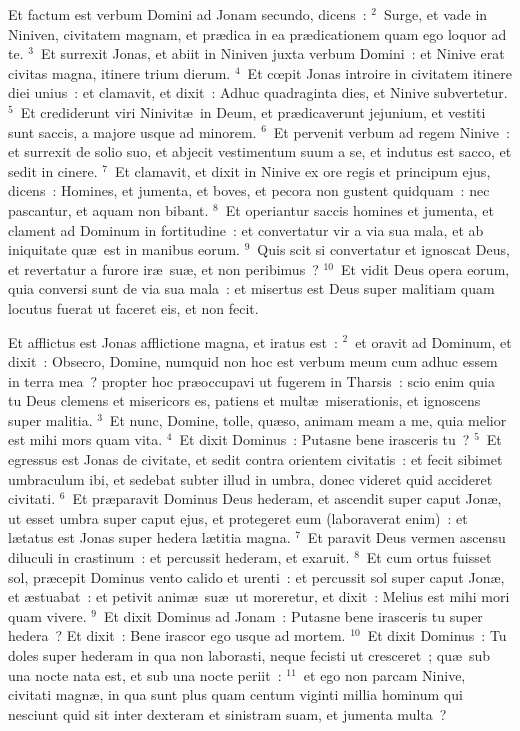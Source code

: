 \lettrine[lines=3,image=true,loversize=0.05,lraise=-0.03]{E}{}t factum est verbum Domini ad Jonam secundo, dicens~:
${}^{2}$~Surge, et vade in Niniven, civitatem magnam, et pr\ae dica in ea pr\ae dicationem quam ego loquor ad te.
${}^{3}$~Et surrexit Jonas, et abiit in Niniven juxta verbum Domini~: et Ninive erat civitas magna, itinere trium dierum.
${}^{4}$~Et cœpit Jonas introire in civitatem itinere diei unius~: et clamavit, et dixit~: Adhuc quadraginta dies, et Ninive subvertetur.
${}^{5}$~Et crediderunt viri Ninivit\ae\ in Deum, et pr\ae dicaverunt jejunium, et vestiti sunt saccis, a majore usque ad minorem.
${}^{6}$~Et pervenit verbum ad regem Ninive~: et surrexit de solio suo, et abjecit vestimentum suum a se, et indutus est sacco, et sedit in cinere.
${}^{7}$~Et clamavit, et dixit in Ninive ex ore regis et principum ejus, dicens~: Homines, et jumenta, et boves, et pecora non gustent quidquam~: nec pascantur, et aquam non bibant.
${}^{8}$~Et operiantur saccis homines et jumenta, et clament ad Dominum in fortitudine~: et convertatur vir a via sua mala, et ab iniquitate qu\ae\ est in manibus eorum.
${}^{9}$~Quis scit si convertatur et ignoscat Deus, et revertatur a furore ir\ae\ su\ae , et non peribimus~?
${}^{10}$~Et vidit Deus opera eorum, quia conversi sunt de via sua mala~: et misertus est Deus super malitiam quam locutus fuerat ut faceret eis, et non fecit.

\lettrine[lines=3,image=true,loversize=0.05,lraise=-0.03]{E}{}t afflictus est Jonas afflictione magna, et iratus est~:
${}^{2}$~et oravit ad Dominum, et dixit~: Obsecro, Domine, numquid non hoc est verbum meum cum adhuc essem in terra mea~? propter hoc pr\ae occupavi ut fugerem in Tharsis~: scio enim quia tu Deus clemens et misericors es, patiens et mult\ae\ miserationis, et ignoscens super malitia.
${}^{3}$~Et nunc, Domine, tolle, qu\ae so, animam meam a me, quia melior est mihi mors quam vita.
${}^{4}$~Et dixit Dominus~: Putasne bene irasceris tu~?
${}^{5}$~Et egressus est Jonas de civitate, et sedit contra orientem civitatis~: et fecit sibimet umbraculum ibi, et sedebat subter illud in umbra, donec videret quid accideret civitati.
${}^{6}$~Et pr\ae paravit Dominus Deus hederam, et ascendit super caput Jon\ae , ut esset umbra super caput ejus, et protegeret eum (laboraverat enim)~: et l\ae tatus est Jonas super hedera l\ae titia magna.
${}^{7}$~Et paravit Deus vermen ascensu diluculi in crastinum~: et percussit hederam, et exaruit.
${}^{8}$~Et cum ortus fuisset sol, pr\ae cepit Dominus vento calido et urenti~: et percussit sol super caput Jon\ae , et \ae stuabat~: et petivit anim\ae\ su\ae\ ut moreretur, et dixit~: Melius est mihi mori quam vivere.
${}^{9}$~Et dixit Dominus ad Jonam~: Putasne bene irasceris tu super hedera~? Et dixit~: Bene irascor ego usque ad mortem.
${}^{10}$~Et dixit Dominus~: Tu doles super hederam in qua non laborasti, neque fecisti ut cresceret~; qu\ae\ sub una nocte nata est, et sub una nocte periit~:
${}^{11}$~et ego non parcam Ninive, civitati magn\ae , in qua sunt plus quam centum viginti millia hominum qui nesciunt quid sit inter dexteram et sinistram suam, et jumenta multa~?
